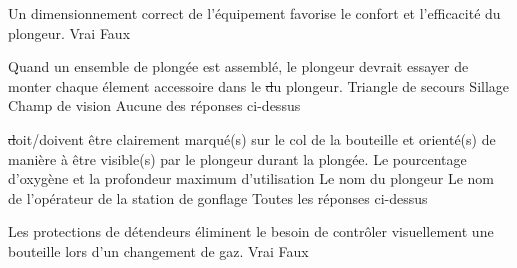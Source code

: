 \documentclass[english,10pt,a4paper,twoside]{article}
\begin{document}
\begin{outline}
		\1 Un dimensionnement correct de l'équipement favorise le confort et l'efficacité du plongeur.
			\2 Vrai
			\2 Faux

		\1 Quand un ensemble de plongée est assemblé, le plongeur devrait essayer de monter chaque élement accessoire dans le \st du plongeur.
			\2 Triangle de secours
			\2 Sillage
			\2 Champ de vision
			\2 Aucune des réponses ci-dessus

		\1 \st doit/doivent être clairement marqué(s) sur le col de la bouteille et orienté(s) de manière à être visible(s) par le plongeur durant la plongée.
			\2 Le pourcentage d'oxygène et la profondeur maximum d'utilisation
			\2 Le nom du plongeur
			\2 Le nom de l'opérateur de la station de gonflage
			\2 Toutes les réponses ci-dessus

		\1 Les protections de détendeurs éliminent le besoin de contrôler visuellement une bouteille lors d'un changement de gaz.
			\2 Vrai
			\2 Faux
	\end{outline}
	\vfill
	\pagebreak

\end{document}
